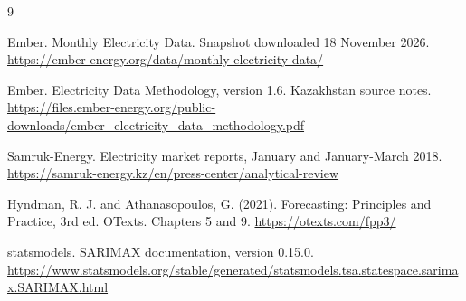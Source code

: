 \documentclass[11pt,a4paper,twoside,reqno]{amsart}
\numberwithin{equation}{section}
\begin{document}
\begin{thebibliography}{9}

 Ember. Monthly Electricity Data. Snapshot downloaded 18 November 2026. \newline\url{https://ember-energy.org/data/monthly-electricity-data/}

 Ember. Electricity Data Methodology, version 1.6. Kazakhstan source notes. \newline\url{https://files.ember-energy.org/public-downloads/ember_electricity_data_methodology.pdf}

 Samruk-Energy. Electricity market reports, January and January-March 2018. \newline\url{https://samruk-energy.kz/en/press-center/analytical-review}

 Hyndman, R. J. and Athanasopoulos, G. (2021). Forecasting: Principles and Practice, 3rd ed. OTexts. Chapters 5 and 9. \newline\url{https://otexts.com/fpp3/}

 statsmodels. SARIMAX documentation, version 0.15.0. \newline\url{https://www.statsmodels.org/stable/generated/statsmodels.tsa.statespace.sarimax.SARIMAX.html}


\end{thebibliography}
\end{document}
